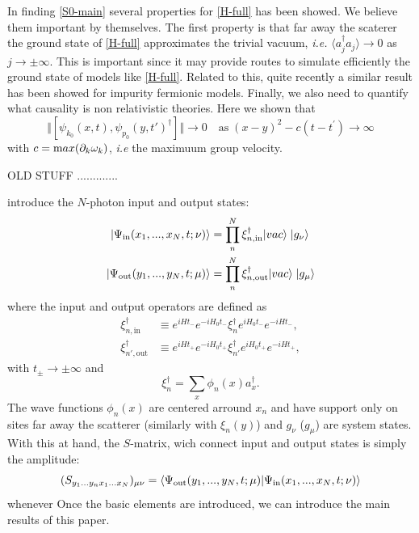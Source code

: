 \documentclass[notitlepage, prx, preprint, amsmath,superscriptaddress,amssymb]{revtex4-1}
\begin{document}
In finding \eqref{S0-main} several  properties for \eqref{H-full} has been showed.  We believe them important by themselves.    The first property is that far away the scaterer the ground state of \eqref{H-full} approximates the trivial vacuum, \emph{i.e.}  $\langle a_j^\dagger a_j \rangle \to 0$ as $j \to \pm \infty$.  This is important since it may provide routes to simulate efficiently the ground state of models like \eqref{H-full}.  Related to this, quite recently a similar result has been showed for impurity fermionic models.  Finally, we also need to quantify what causality is non relativistic theories.  Here we shown that 
\begin{equation}
\Vert[\psi_{k_0}(x,t),\psi_{p_0}(y,t')^\dagger]\Vert \to 0  \quad
\text{as} \;  (x-y)^2 -c (t-t^\prime) \to \infty
\end{equation}
with $c= {\text max} ( \partial_k \omega_k )$, \emph{i.e} the maximuum group velocity.

OLD STUFF .............

 introduce the $N$-photon  input and output states:
\begin{align}
| \Psi_{\rm in} (x_1, ..., x_N, t; \nu) \rangle &= \prod_n^N  \xi^\dagger_{n, \text{in}} |vac \rangle  \; |g_\nu \rangle
\\
| \Psi_{\rm out} (y_1, ..., y_N, t; \mu) \rangle &= \prod_{n}^N \xi^\dagger_{n, \text{out}} |vac \rangle  \; |g_\mu \rangle
\end{align} 
where the input and output operators are defined as
\begin{align}
\xi_{n,\text{in}}^\dagger & \equiv e^{iHt_-} e^{-iH_0t_-}\xi_n^\dagger e^{iH_0 t_-} e^{-iHt_-},\\
\xi_{n',\text{out}}^\dagger & \equiv e^{iHt_+} e^{-iH_0t_+}\xi_{n'}^\dagger e^{iH_0 t_+} e^{-iHt_+},
\end{align}
with $t_\pm \to\pm\infty$ and
\begin{equation}
\xi_n^\dagger = \sum_x  \phi_n(x) a_x^\dagger.
\end{equation}
The wave functions $\phi_n(x)$ are centered arround $x_n$ and  have support only on sites far away the scatterer (similarly with $\xi_n (y)$) and  $g_\nu$  ($g_\mu$) are system states.  With this at hand, the $S$-matrix, wich connect input and output states is simply the amplitude:
\begin{equation}
( S_{y_1 ...y_n x_1...x_N} )_{\mu \nu} =  \langle \Psi_{\rm out} (y_1, ..., y_N, t; \mu) | \Psi_{\rm in} (x_1, ..., x_N, t; \nu) \rangle
\end{equation}
whenever 
Once the basic elements are introduced, we can introduce the main results of this paper.  
\end{document}
